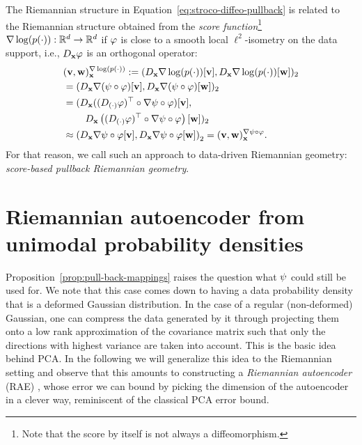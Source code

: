 The Riemannian structure in Equation~\ref{eq:stroco-diffeo-pullback} is related to the Riemannian structure obtained from the \emph{score function}\footnote{Note that the score by itself is not always a diffeomorphism.} $\nabla \log(p(\cdot)):\mathbb{R}^d\to\mathbb{R}^d$ if $\varphi$ is close to a smooth local $\ell^2$-isometry on the data support, i.e., $D_{\mathbf{x}} \varphi$ is an orthogonal operator:
\begin{align}
    & (\mathbf{v}, \mathbf{w})^{\nabla \log(p(\cdot))}_{\mathbf{x}} 
    := (D_{\mathbf{x}} \nabla \log(p(\cdot))[\mathbf{v}], D_{\mathbf{x}} \nabla \log(p(\cdot))[\mathbf{w}])_2 \notag \\
    & = (D_{\mathbf{x}} \nabla (\psi \circ \varphi)[\mathbf{v}], D_{\mathbf{x}} \nabla (\psi \circ \varphi)[\mathbf{w}])_2 \notag \\
    & = (D_{\mathbf{x}} ((D_{(\cdot)} \varphi)^{\top} \circ \nabla \psi \circ \varphi)[\mathbf{v}], \notag \\
    & \quad\quad\; D_{\mathbf{x}} \left((D_{(\cdot)} \varphi)^{\top} \circ \nabla \psi \circ \varphi\right)[\mathbf{w}])_2 \notag \\
    & \approx \left(D_{\mathbf{x}} \nabla \psi \circ \varphi[\mathbf{v}], D_{\mathbf{x}} \nabla \psi \circ \varphi[\mathbf{w}]\right)_2 
    = (\mathbf{v}, \mathbf{w})^{\nabla \psi \circ \varphi}_{\mathbf{x}}.
\end{align}
For that reason, we call such an approach to data-driven Riemannian geometry: \emph{score-based pullback Riemannian geometry}. 

\section{Riemannian autoencoder from unimodal probability densities}
\label{sec:rae}

Proposition~\ref{prop:pull-back-mappings} raises the question what $\psi$ could still be used for. 
We note that this case comes down to having a data probability density that is a deformed Gaussian distribution. In the case of a regular (non-deformed) Gaussian, one can compress the data generated by it through projecting them onto a low rank approximation of the covariance matrix such that only the directions with highest variance are taken into account. This is the basic idea behind PCA. In the following we will generalize this idea to the Riemannian setting and observe that this amounts to constructing a \emph{Riemannian autoencoder} (RAE) \cite[Sec.~4]{diepeveen2024pulling}, whose error we can bound by picking the dimension of the autoencoder in a clever way, reminiscent of the classical PCA error bound.

